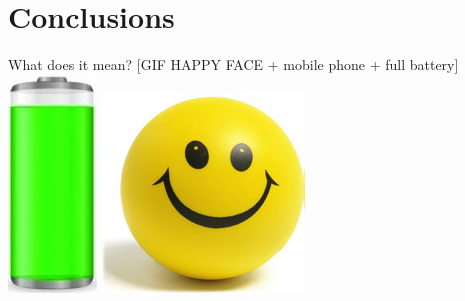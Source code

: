 \documentclass[a2,landscape]{a0poster}
\begin{document}
\section*{Conclusions}
What does it mean?
[GIF HAPPY FACE + mobile phone + full battery]\\
\includegraphics[scale=0.7]{plots/full_battery}
\includegraphics[scale=0.7]{plots/happy_face}
\end{document}
